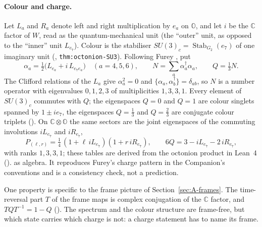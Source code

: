 \paragraph{Colour and charge.}
Let $L_a$ and $R_a$ denote left and right multiplication by $e_a$ on $\mathbb O$, and let $i$ be the $\mathbb C$ factor of $W$,
read as the quantum-mechanical unit (the ``outer'' unit, as opposed to the ``inner'' unit $L_{e_7}$). Colour is the
stabiliser $SU(3)_c=\operatorname{Stab}_{G_2}(e_7)$ of one imaginary unit (\cite{QSC}, \texttt{thm:octonion-SU3}). Following
Furey \cite{Furey2015}, put
\begin{equation}
 \alpha_a=\tfrac12\bigl(L_{e_a}+i\,L_{e_7e_a}\bigr)\quad(a=4,5,6),\qquad
 N=\sum_a\alpha_a^\dagger\alpha_a,\qquad Q=\tfrac13N .
 \label{eq:B-number-operator}
\end{equation}
The Clifford relations of the $L_a$ give $\alpha_a^2=0$ and $\{\alpha_a,\alpha_b^\dagger\}=\delta_{ab}$, so $N$ is a number
operator with eigenvalues $0,1,2,3$ of multiplicities $1,3,3,1$. Every element of $SU(3)_c$ commutes with $Q$; the
eigenspaces $Q=0$ and $Q=1$ are colour singlets spanned by $1\pm ie_7$, the eigenspaces $Q=\tfrac13$ and $Q=\tfrac23$ are
conjugate colour triplets (). On $\mathbb C\otimes\mathbb O$ the same sectors are the joint eigenspaces of the
commuting involutions $iL_{e_7}$ and $iR_{e_7}$,
\begin{equation}
 P_{(\ell,r)}=\tfrac14\,(1+\ell\,iL_{e_7})(1+r\,iR_{e_7}),\qquad 6Q=3-iL_{e_7}-2\,iR_{e_7},
 \label{eq:B-sectors}
\end{equation}
with ranks $1,3,3,1$; these tables are derived from the octonion product in Lean~4 (). \Established{} as
algebra. It reproduces Furey's charge pattern in the Companion's conventions and is a consistency check, not a prediction.

One property is specific to the frame picture of Section~\ref{sec:A-frames}. The time-reversal part $T$ of the frame maps is complex
conjugation of the $\mathbb C$ factor, and $TQT^{-1}=1-Q$ (). The spectrum and the colour structure are
frame-free, but which state carries which charge is not: a charge statement has to name its frame.

